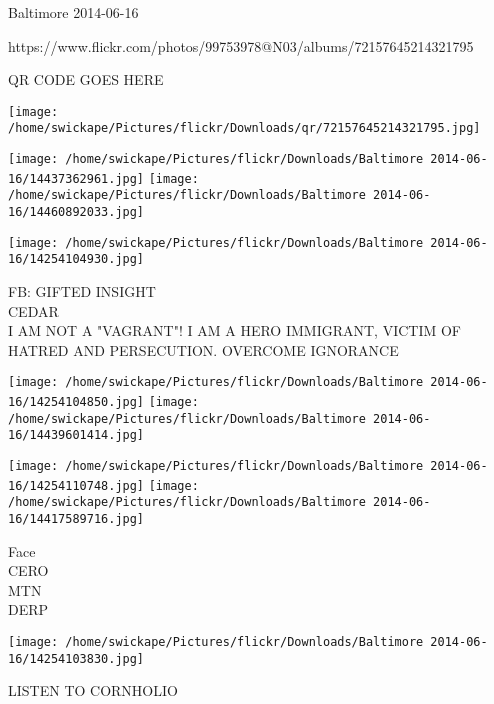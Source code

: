 \documentclass[10pt,letterpaper]{article}
\begin{document}
Baltimore 2014-06-16

https://www.flickr.com/photos/99753978@N03/albums/72157645214321795

QR CODE GOES HERE

\texttt{[image: /home/swickape/Pictures/flickr/Downloads/qr/72157645214321795.jpg]}
\pagebreak

\texttt{[image: /home/swickape/Pictures/flickr/Downloads/Baltimore 2014-06-16/14437362961.jpg]}
\texttt{[image: /home/swickape/Pictures/flickr/Downloads/Baltimore 2014-06-16/14460892033.jpg]}

\vspace{0.25in}
\texttt{[image: /home/swickape/Pictures/flickr/Downloads/Baltimore 2014-06-16/14254104930.jpg]}

FB: GIFTED INSIGHT\\
CEDAR\\
I AM NOT A "VAGRANT"!  I AM A HERO IMMIGRANT, VICTIM OF HATRED AND PERSECUTION.  OVERCOME IGNORANCE\\
\pagebreak

\texttt{[image: /home/swickape/Pictures/flickr/Downloads/Baltimore 2014-06-16/14254104850.jpg]}
\texttt{[image: /home/swickape/Pictures/flickr/Downloads/Baltimore 2014-06-16/14439601414.jpg]}

\texttt{[image: /home/swickape/Pictures/flickr/Downloads/Baltimore 2014-06-16/14254110748.jpg]}
\texttt{[image: /home/swickape/Pictures/flickr/Downloads/Baltimore 2014-06-16/14417589716.jpg]}

Face\\
CERO\\
MTN\\
DERP\\
\pagebreak

\texttt{[image: /home/swickape/Pictures/flickr/Downloads/Baltimore 2014-06-16/14254103830.jpg]}

LISTEN TO CORNHOLIO\\
\pagebreak
\end{document}
